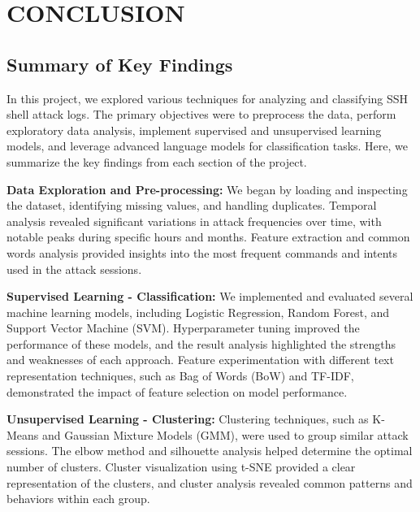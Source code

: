 

\section{CONCLUSION}


    \subsection{Summary of Key Findings}
    
        In this project, we explored various techniques for analyzing and classifying SSH shell attack logs. The primary objectives were to preprocess the data, perform exploratory data analysis, implement supervised and unsupervised learning models, and leverage advanced language models for classification tasks. Here, we summarize the key findings from each section of the project.

        \textbf{Data Exploration and Pre-processing:} We began by loading and inspecting the dataset, identifying missing values, and handling duplicates. Temporal analysis revealed significant variations in attack frequencies over time, with notable peaks during specific hours and months. Feature extraction and common words analysis provided insights into the most frequent commands and intents used in the attack sessions.

        \textbf{Supervised Learning - Classification:} We implemented and evaluated several machine learning models, including Logistic Regression, Random Forest, and Support Vector Machine (SVM). Hyperparameter tuning improved the performance of these models, and the result analysis highlighted the strengths and weaknesses of each approach. Feature experimentation with different text representation techniques, such as Bag of Words (BoW) and TF-IDF, demonstrated the impact of feature selection on model performance.

        \textbf{Unsupervised Learning - Clustering:} Clustering techniques, such as K-Means and Gaussian Mixture Models (GMM), were used to group similar attack sessions. The elbow method and silhouette analysis helped determine the optimal number of clusters. Cluster visualization using t-SNE provided a clear representation of the clusters, and cluster analysis revealed common patterns and behaviors within each group.

